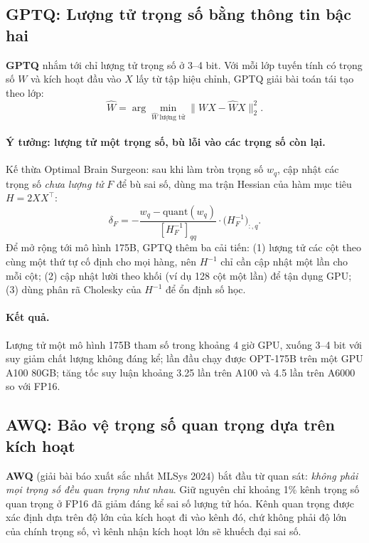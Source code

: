 \subsection{GPTQ: Lượng tử trọng số bằng thông tin bậc hai}
\label{ssec:gptq}
\textbf{GPTQ} \cite{frantar2023gptq} nhắm tới chỉ lượng tử trọng số ở 3--4 bit. Với mỗi lớp tuyến tính có trọng số $W$ và kích hoạt đầu vào $X$ lấy từ tập hiệu chỉnh, GPTQ giải bài toán tái tạo theo lớp:
\[
\hat{W} = \arg\min_{\hat{W}\ \text{lượng tử}} \big\|WX - \hat{W}X\big\|_2^2 .
\]
\paragraph{Ý tưởng: lượng tử một trọng số, bù lỗi vào các trọng số còn lại.} Kế thừa Optimal Brain Surgeon: sau khi làm tròn trọng số $w_q$, cập nhật các trọng số \emph{chưa lượng tử} $F$ để bù sai số, dùng ma trận Hessian của hàm mục tiêu $H = 2XX^\top$:
\[
\delta_F = -\frac{w_q - \text{quant}(w_q)}{[H_F^{-1}]_{qq}} \cdot \big(H_F^{-1}\big)_{:,q}.
\]
Để mở rộng tới mô hình 175B, GPTQ thêm ba cải tiến: (1) lượng tử các cột theo cùng một thứ tự cố định cho mọi hàng, nên $H^{-1}$ chỉ cần cập nhật một lần cho mỗi cột; (2) cập nhật lười theo khối (ví dụ 128 cột một lần) để tận dụng GPU; (3) dùng phân rã Cholesky của $H^{-1}$ để ổn định số học.
\paragraph{Kết quả.} Lượng tử một mô hình 175B tham số trong khoảng 4 giờ GPU, xuống 3--4 bit với suy giảm chất lượng không đáng kể; lần đầu chạy được OPT-175B trên một GPU A100 80GB; tăng tốc suy luận khoảng 3.25 lần trên A100 và 4.5 lần trên A6000 so với FP16.

\subsection{AWQ: Bảo vệ trọng số quan trọng dựa trên kích hoạt}
\label{ssec:awq}
\textbf{AWQ} \cite{lin2024awq} (giải bài báo xuất sắc nhất MLSys 2024) bắt đầu từ quan sát: \emph{không phải mọi trọng số đều quan trọng như nhau}. Giữ nguyên chỉ khoảng 1\% kênh trọng số quan trọng ở FP16 đã giảm đáng kể sai số lượng tử hóa. Kênh quan trọng được xác định dựa trên độ lớn của kích hoạt đi vào kênh đó, chứ không phải độ lớn của chính trọng số, vì kênh nhận kích hoạt lớn sẽ khuếch đại sai số.

